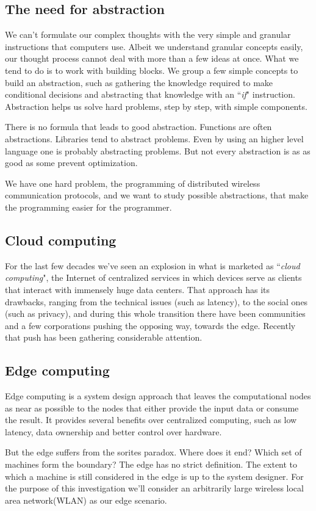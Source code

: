 \documentclass[runningheads]{llncs}
\begin{document}
\subsection{The need for abstraction}
We can't formulate our complex thoughts with the very simple and granular instructions that computers use.
Albeit we understand granular concepts easily, our thought process cannot deal with more than a few ideas at once. What we tend to do is to work with building blocks. We group a few simple concepts to build an abstraction, such as gathering the knowledge required to make conditional decisions and abstracting that knowledge with an ``\textit{if}" instruction.
Abstraction helps us solve hard problems, step by step, with simple components.
\par There is no formula that leads to good abstraction. Functions are often abstractions. Libraries tend to abstract problems.
Even by using an higher level language one is probably abstracting problems. But not every abstraction is as as good as some prevent optimization.
\par We have one hard problem, the  programming of distributed wireless communication protocols, and we want to study possible abstractions, that make the programming easier for the programmer.
\subsection{Cloud computing}
For the last few decades we've seen an explosion in what is marketed as ``\textit{cloud computing}", the Internet of centralized services in which devices serve as clients that interact with immensely huge data centers.
That approach has its drawbacks, ranging from the technical issues (such as latency), to the social ones (such as privacy), and during this whole transition there have been communities and a few corporations pushing the opposing way, towards the edge. Recently that push has been gathering considerable attention.
\subsection{Edge computing}
Edge computing is a system design approach that leaves the computational nodes as near as possible to the nodes that either provide the input data or consume the result.
It provides several benefits over centralized computing, such as low latency, data ownership and better control over hardware.
\par But the edge suffers from the sorites paradox. Where does it end? Which set of machines form the boundary?
The edge has no strict definition. The extent to which a machine is still considered in the edge is up to the system designer. For the purpose of this investigation we'll consider an arbitrarily large wireless local area network(WLAN) as our edge scenario.
\end{document}
